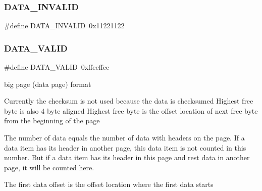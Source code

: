 \mbox{\label{adat-devel_2other__libs_2filedb_2filehash_2ffdb__page_8h_ae4f8131dfd7af7cb4f6b0a3f4d6fc451}} 
\subsubsection{\texorpdfstring{DATA\_INVALID}{DATA\_INVALID}}
{\footnotesize\ttfamily \#define D\+A\+T\+A\+\_\+\+I\+N\+V\+A\+L\+ID~0x11221122}

\mbox{\label{adat-devel_2other__libs_2filedb_2filehash_2ffdb__page_8h_aaf28170a8fc3621832a11bed0ca9d4e3}} 
\subsubsection{\texorpdfstring{DATA\_VALID}{DATA\_VALID}}
{\footnotesize\ttfamily \#define D\+A\+T\+A\+\_\+\+V\+A\+L\+ID~0xffeeffee}

big page (data page) format

Currently the checksum is not used because the data is checksumed Highest free byte is also 4 byte aligned Highest free byte is the offset location of next free byte from the beginning of the page

The number of data equals the number of data with headers on the page. If a data item has its header in another page, this data item is not counted in this number. But if a data item has its header in this page and rest data in another page, it will be counted here.

The first data offset is the offset location where the first data starts

